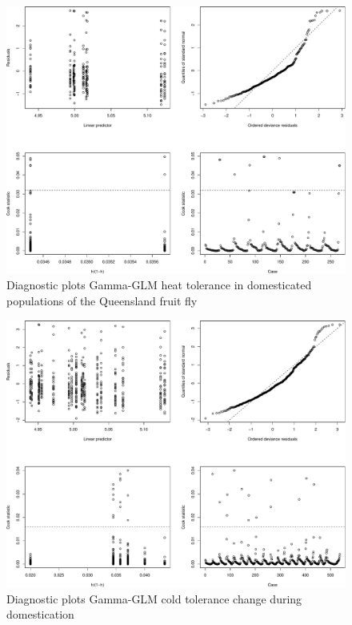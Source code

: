 \documentclass[]{article}
\begin{document}
\begin{figure}

{\centering \includegraphics{Supplementary_files/figure-latex/Diagnostic plots cold tolerance in domesticated flies-1} 

}

\caption{Diagnostic plots Gamma-GLM heat tolerance in domesticated populations of the Queensland fruit fly}\label{fig:Diagnostic plots cold tolerance in domesticated flies}
\end{figure}

\begin{figure}

{\centering \includegraphics{Supplementary_files/figure-latex/Diagnostic plots cold tolerance during domestication-1} 

}

\caption{Diagnostic plots Gamma-GLM cold tolerance change during domestication}\label{fig:Diagnostic plots cold tolerance during domestication}
\end{figure}
\end{document}
